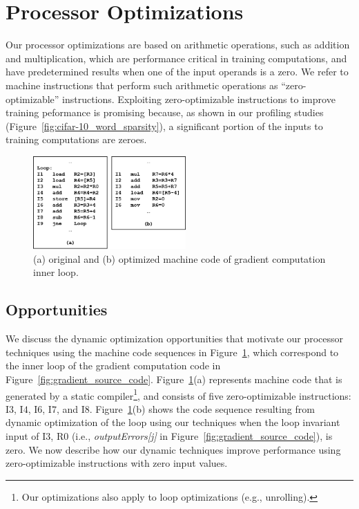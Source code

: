 \section{Processor Optimizations}
\label{sec:processor_opt}

Our processor optimizations are based on arithmetic operations, such as addition and multiplication, which are performance critical in training computations, and have predetermined results when one of the input operands is a zero. We refer to machine instructions that perform such arithmetic operations as ``zero-optimizable'' instructions. Exploiting zero-optimizable instructions to improve training peformance is promising because, as shown in our profiling studies (Figure~\ref{fig:cifar-10_word_sparsity}), a significant portion of the inputs to training computations are zeroes. 

\begin{figure}
\centering
\includegraphics[height=1.4in, width=.9\columnwidth]{Figures/gradient_machine_code.png}
\caption{(a) original and (b) optimized machine code of gradient computation inner loop.}
\label{fig:gradient_code_opt}
\end{figure}

\subsection{Opportunities}

We discuss the dynamic optimization opportunities that motivate our processor techniques using the machine code sequences in Figure~\ref{fig:gradient_code_opt}, which correspond to the inner loop of the gradient computation code in Figure~\ref{fig:gradient_source_code}.    Figure~\ref{fig:gradient_code_opt}(a) represents machine code that is generated by a static compiler\footnote{Our optimizations also apply to loop optimizations (e.g., unrolling).}, and consists of five zero-optimizable instructions: I$3$, I$4$, I$6$, I$7$, and I$8$.  Figure~\ref{fig:gradient_code_opt}(b) shows the code sequence resulting from dynamic optimization of the loop using our techniques when the loop invariant input of I$3$, R$0$ (i.e., \emph{outputErrors[j]} in Figure~\ref{fig:gradient_source_code}), is zero.  We now describe how our dynamic techniques improve performance using zero-optimizable instructions with zero input values. 

